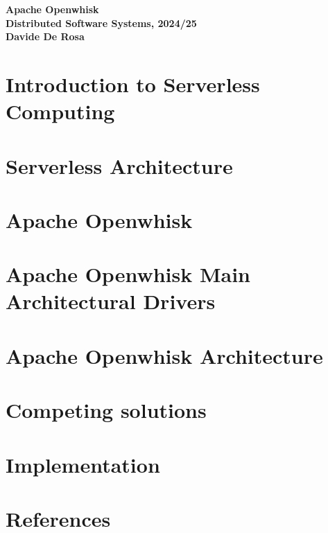 \documentclass[12pt]{article}
\begin{document}
\begin{center}
\LARGE
\textbf{Apache Openwhisk} \vspace{10pt}\\
\Large
\textbf{Distributed Software Systems, 2024/25} \vspace{10pt}\\
\large
\textbf{Davide De Rosa}
\end{center}

\section{Introduction to Serverless Computing}


\section{Serverless Architecture}


\section{Apache Openwhisk}


\section{Apache Openwhisk Main Architectural Drivers}


\section{Apache Openwhisk Architecture}


\section{Competing solutions}


\section{Implementation}


\renewcommand{\bibsection}{}
\section*{References}

\end{document}
